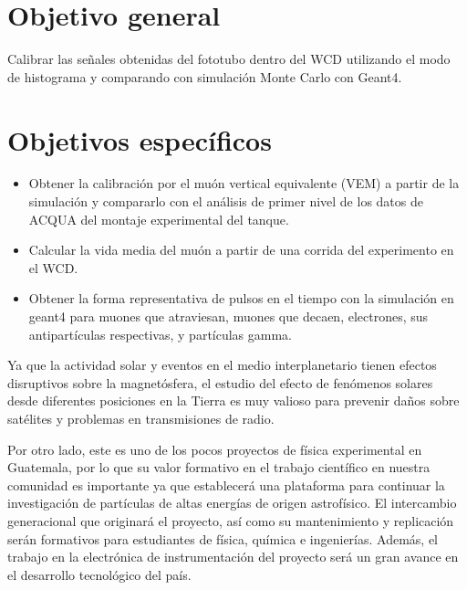 \documentclass{book}
\begin{document}

\section{Objetivo general}
Calibrar las se\~nales obtenidas del fototubo dentro del WCD utilizando el modo de histograma y comparando con simulaci\'on Monte Carlo con Geant4.
\section{Objetivos espec\'ificos}
\begin{itemize}
 \item Obtener la calibraci\'on por el mu\'on vertical equivalente (VEM) a partir de la simulaci\'on y compararlo con el an\'alisis de primer nivel de los datos de ACQUA del montaje experimental del tanque.
 \item Calcular la vida media del mu\'on a partir de una corrida del experimento en el WCD.
 \item Obtener la forma representativa de pulsos en el tiempo con la simulaci\'on en geant4 para muones que atraviesan, muones que decaen, electrones, sus antipartículas respectivas, y partículas gamma.
\end{itemize}



Ya que la actividad solar y eventos en el medio interplanetario tienen efectos disruptivos sobre la magnet\'osfera, el estudio del efecto de fen\'omenos solares desde diferentes posiciones en la Tierra es muy valioso para prevenir da\~nos sobre sat\'elites y problemas en transmisiones de radio.

Por otro lado, este es uno de los pocos proyectos de f\'isica experimental en Guatemala, por lo que su valor formativo en el trabajo cient\'ifico en nuestra comunidad es importante ya que establecer\'a una plataforma para continuar la investigaci\'on de part\'iculas de altas energ\'ias de origen astrof\'isico. El intercambio generacional que originar\'a el proyecto, as\'i como su mantenimiento y replicaci\'on ser\'an formativos para estudiantes de f\'isica, qu\'imica e ingenier\'ias. Adem\'as, el trabajo en la electr\'onica de instrumentaci\'on del proyecto ser\'a un gran avance en el desarrollo tecnol\'ogico del pa\'is.


\end{document}
